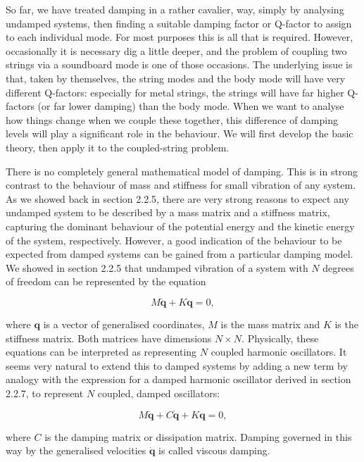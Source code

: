   So far, we have treated damping in a rather cavalier, way, simply by 
  analysing undamped systems, then finding a suitable damping factor or 
  Q-factor to assign to each individual mode. For most purposes this is all 
  that is required. However, occasionally it is necessary dig a little deeper, 
  and the problem of coupling two strings via a soundboard mode is one of those 
  occasions. The underlying issue is that, taken by themselves, the string 
  modes and the body mode will have very different Q-factors: especially for 
  metal strings, the strings will have far higher Q-factors (or far lower 
  damping) than the body mode. When we want to analyse how things change when 
  we couple these together, this difference of damping levels will play a 
  significant role in the behaviour. We will first develop the basic theory, 
  then apply it to the coupled-string problem. 

  There is no completely general mathematical model of damping. This is in 
  strong contrast to the behaviour of mass and stiffness for small vibration of 
  any system. As we showed back in section 2.2.5, there are very strong reasons 
  to expect any undamped system to be described by a mass matrix and a 
  stiffness matrix, capturing the dominant behaviour of the potential energy 
  and the kinetic energy of the system, respectively. However, a good 
  indication of the behaviour to be expected from damped systems can be gained 
  from a particular damping model. We showed in section 2.2.5 that undamped 
  vibration of a system with $N$ degrees of freedom can be represented by the 
  equation 

  $$M \ddot{\mathbf{q}} + K \mathbf{q}= 0, \tag{1}$$ 

  where $\mathbf{q}$ is a vector of generalised coordinates, $M$ is the mass 
  matrix and $K$ is the stiffness matrix. Both matrices have dimensions $N 
  \times N$. Physically, these equations can be interpreted as representing $N$ 
  coupled harmonic oscillators. It seems very natural to extend this to damped 
  systems by adding a new term by analogy with the expression for a damped 
  harmonic oscillator derived in section 2.2.7, to represent $N$ coupled, 
  damped oscillators: 

  $$M \ddot{\mathbf{q}} + C \dot{\mathbf{q}} + K \mathbf{q}= 0, \tag{2}$$ 

  where $C$ is the damping matrix or dissipation matrix. Damping governed in 
  this way by the generalised velocities $\dot{\mathbf{q}}$ is called viscous 
  damping. 

